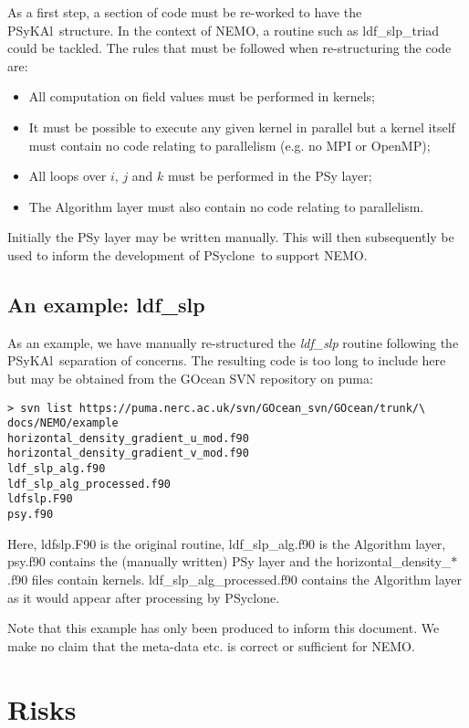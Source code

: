 \documentclass{article}
\newcommand{\psykal}{{PS}y{KA}l}
\newcommand{\psyclone}{{PS}yclone}
\begin{document}
As a first step, a section of code must be re-worked to have the
\psykal\ structure. In the context of NEMO, a routine such as
ldf\_slp\_triad could be tackled. The rules that must be followed when
re-structuring the code are:
\begin{itemize}
\item All computation on field values must be performed in kernels;
\item It must be possible to execute any given kernel in parallel but
  a kernel itself must contain no code relating to parallelism
  (e.g. no MPI or OpenMP);
\item All loops over $i$, $j$ and $k$ must be performed in the PSy
  layer;
\item The Algorithm layer must also contain no code relating to
  parallelism.
\end{itemize}
Initially the PSy layer may be written manually. This will then
subsequently be used to inform the development of \psyclone\ to support
NEMO.

\subsection{An example: ldf\_slp}

As an example, we have manually re-structured the {\it ldf\_slp}
routine following the \psykal\ separation of concerns. The resulting
code is too long to include here but may be obtained from the GOcean
SVN repository on puma:
\begin{verbatim}
> svn list https://puma.nerc.ac.uk/svn/GOcean_svn/GOcean/trunk/\
docs/NEMO/example
horizontal_density_gradient_u_mod.f90
horizontal_density_gradient_v_mod.f90
ldf_slp_alg.f90
ldf_slp_alg_processed.f90
ldfslp.F90
psy.f90
\end{verbatim}

Here, ldfslp.F90 is the original routine, ldf\_slp\_alg.f90 is the
Algorithm layer, psy.f90 contains the (manually written) PSy layer and
the horizontal\_density\_$\ast$.f90 files contain kernels.
ldf\_slp\_alg\_processed.f90 contains the Algorithm layer as it would
appear after processing by \psyclone.

Note that this example has only been produced to inform this
document. We make no claim that the meta-data etc. is correct or
sufficient for NEMO.
 
\section{Risks}
\end{document}
